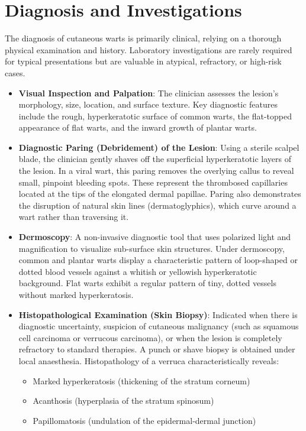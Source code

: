 \section*{Diagnosis and Investigations}
The diagnosis of cutaneous warts is primarily clinical, relying on a thorough physical examination and history. Laboratory investigations are rarely required for typical presentations but are valuable in atypical, refractory, or high-risk cases.
\begin{itemize}
    \item \textbf{Visual Inspection and Palpation}: The clinician assesses the lesion's morphology, size, location, and surface texture. Key diagnostic features include the rough, hyperkeratotic surface of common warts, the flat-topped appearance of flat warts, and the inward growth of plantar warts.
    \item \textbf{Diagnostic Paring (Debridement) of the Lesion}: Using a sterile scalpel blade, the clinician gently shaves off the superficial hyperkeratotic layers of the lesion. In a viral wart, this paring removes the overlying callus to reveal small, pinpoint bleeding spots. These represent the thrombosed capillaries located at the tips of the elongated dermal papillae. Paring also demonstrates the disruption of natural skin lines (dermatoglyphics), which curve around a wart rather than traversing it.
    \item \textbf{Dermoscopy}: A non-invasive diagnostic tool that uses polarized light and magnification to visualize sub-surface skin structures. Under dermoscopy, common and plantar warts display a characteristic pattern of loop-shaped or dotted blood vessels against a whitish or yellowish hyperkeratotic background. Flat warts exhibit a regular pattern of tiny, dotted vessels without marked hyperkeratosis.
    \item \textbf{Histopathological Examination (Skin Biopsy)}: Indicated when there is diagnostic uncertainty, suspicion of cutaneous malignancy (such as squamous cell carcinoma or verrucous carcinoma), or when the lesion is completely refractory to standard therapies. A punch or shave biopsy is obtained under local anaesthesia. Histopathology of a verruca characteristically reveals:
    \begin{itemize}
        \item Marked hyperkeratosis (thickening of the stratum corneum)
        \item Acanthosis (hyperplasia of the stratum spinosum)
        \item Papillomatosis (undulation of the epidermal-dermal junction)

\end{itemize}
\end{itemize}
